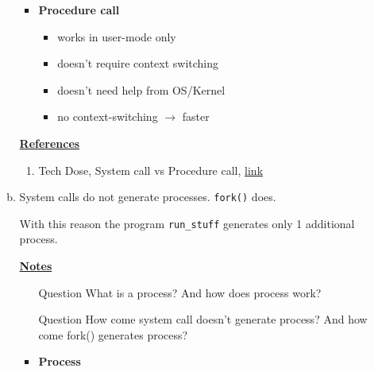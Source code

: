 \documentclass[12pt]{article}
\begin{document}
\begin{enumerate}[1.]
\begin{enumerate}[a)]
\begin{itemize}
            \item \textbf{Procedure call}
            \begin{itemize}
                \item works in user-mode only
                \item doesn't require context switching
                \item doesn't need help from OS/Kernel
                \item no context-switching $\to$ faster
            \end{itemize}
        \end{itemize}

        \bigskip

        \underline{\textbf{References}}

        \begin{enumerate}[1.]
            \item Tech Dose, System call vs Procedure call, \href{https://www.youtube.com/watch?v=98uHzqmPABY&ab_channel=TECHDOSE}{link}
        \end{enumerate}

        \item

        System calls do not generate processes. \texttt{fork()} does.

        \bigskip

        With this reason the program \texttt{run\_stuff} generates only 1 additional process.

        \bigskip

        \underline{\textbf{Notes}}

        \begin{itemize}
            \item [\color{blue}Question\color{black}] What is a process? And how does process work?
            \item [\color{blue}Question\color{black}] How come system call doesn't generate process? And how come
            fork() generates process?

            \item \textbf{Process}


\end{itemize}
\end{enumerate}
\end{enumerate}
\end{document}
